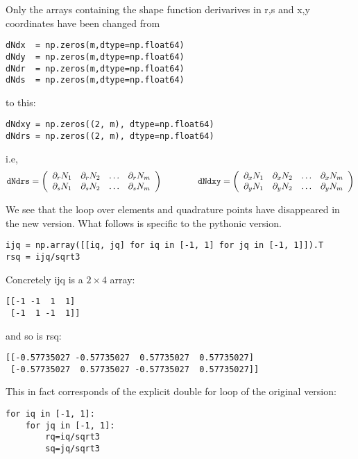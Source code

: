 Only the arrays containing the shape function derivarives in r,s and x,y
coordinates have been changed from 

\begin{lstlisting}
dNdx  = np.zeros(m,dtype=np.float64)   
dNdy  = np.zeros(m,dtype=np.float64)    
dNdr  = np.zeros(m,dtype=np.float64)     
dNds  = np.zeros(m,dtype=np.float64)       
\end{lstlisting}
 
to this:

\begin{lstlisting}
dNdxy = np.zeros((2, m), dtype=np.float64)  
dNdrs = np.zeros((2, m), dtype=np.float64)  
\end{lstlisting}

i.e,
\[
{\tt dNdrs} = 
\left(
\begin{array}{cccc}
\partial_r N_1 & \partial_r N_2 & \dots & \partial_r N_m \\ 
\partial_s N_1 & \partial_s N_2 & \dots & \partial_s N_m 
\end{array}
\right)
\qquad
\qquad
{\tt dNdxy} = 
\left(
\begin{array}{cccc}
\partial_x N_1 & \partial_x N_2 & \dots & \partial_x N_m \\ 
\partial_y N_1 & \partial_y N_2 & \dots & \partial_y N_m 
\end{array}
\right)
\]

We see that the loop over elements and quadrature points have disappeared in the new version. 
What follows is specific to the pythonic version. 

\begin{lstlisting}
ijq = np.array([[iq, jq] for iq in [-1, 1] for jq in [-1, 1]]).T
rsq = ijq/sqrt3
\end{lstlisting}
Concretely ijq is a $2\times 4$ array:
\begin{verbatim}
[[-1 -1  1  1]
 [-1  1 -1  1]]
\end{verbatim}
and so is rsq:
\begin{verbatim}
[[-0.57735027 -0.57735027  0.57735027  0.57735027]
 [-0.57735027  0.57735027 -0.57735027  0.57735027]]
\end{verbatim}
This in fact corresponds of the explicit double for loop of the original version:
\begin{lstlisting}
for iq in [-1, 1]:
    for jq in [-1, 1]:
        rq=iq/sqrt3
        sq=jq/sqrt3
\end{lstlisting}



